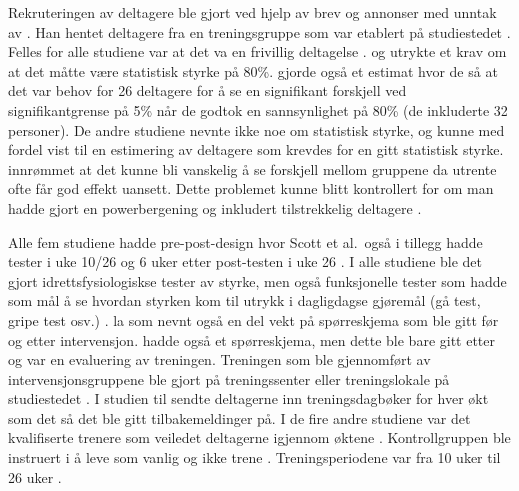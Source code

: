 \documentclass[
]{book}
\begin{document}
Rekruteringen av deltagere ble gjort ved hjelp av brev og annonser med unntak av \citeauthor{schott2019} \citetext{\citeyear{schott2019}; \citealp{geirsdottir2012}; \citealp{turpela2017}; \citealp{vikberg2019}; \citealp{vincent2002}}. Han hentet deltagere fra en treningsgruppe som var etablert på studiestedet \citep{schott2019}. Felles for alle studiene var at det va en frivillig deltagelse \citep{geirsdottir2012, schott2019, turpela2017, vikberg2019, vincent2002}. \citet{schott2019} og \citet{vincent2002} utrykte et krav om at det måtte være statistisk styrke på 80\%. \citet{schott2019} gjorde også et estimat hvor de så at det var behov for 26 deltagere for å se en signifikant forskjell ved signifikantgrense på 5\% når de godtok en sannsynlighet på 80\% (de inkluderte 32 personer). De andre studiene nevnte ikke noe om statistisk styrke, og kunne med fordel vist til en estimering av deltagere som krevdes for en gitt statistisk styrke. \citet{turpela2017} innrømmet at det kunne bli vanskelig å se forskjell mellom gruppene da utrente ofte får god effekt uansett. Dette problemet kunne blitt kontrollert for om man hadde gjort en powerbergening og inkludert tilstrekkelig deltagere \citep[s. 48-49]{hulley2013} .

Alle fem studiene hadde pre-post-design hvor Scott et al.~også i tillegg hadde tester i uke 10/26 og 6 uker etter post-testen i uke 26 \citep{geirsdottir2012, schott2019, turpela2017, vikberg2019, vincent2002}. I alle studiene ble det gjort idrettsfysiologiskse tester av styrke, men også funksjonelle tester som hadde som mål å se hvordan styrken kom til utrykk i dagligdagse gjøremål (gå test, gripe test osv.) \citep{geirsdottir2012, schott2019, turpela2017, vikberg2019, vincent2002}. \citet{geirsdottir2012} la som nevnt også en del vekt på spørreskjema som ble gitt før og etter intervensjon. \citet{schott2019} hadde også et spørreskjema, men dette ble bare gitt etter og var en evaluering av treningen. Treningen som ble gjennomført av intervensjonsgruppene ble gjort på treningssenter eller treningslokale på studiestedet \citep{geirsdottir2012, schott2019, turpela2017, vikberg2019, vincent2002}. I studien til \citet{vincent2002} sendte deltagerne inn treningsdagbøker for hver økt som det så det ble gitt tilbakemeldinger på. I de fire andre studiene var det kvalifiserte trenere som veiledet deltagerne igjennom øktene \citep{geirsdottir2012, schott2019, turpela2017, vikberg2019}. Kontrollgruppen ble instruert i å leve som vanlig og ikke trene \citep{schott2019, turpela2017, vikberg2019, vincent2002}. Treningsperiodene var fra 10 uker til 26 uker \citep{geirsdottir2012, schott2019, turpela2017, vikberg2019, vincent2002}.
\end{document}
